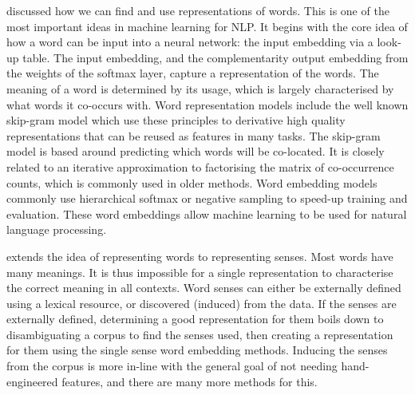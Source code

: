\documentclass[12pt,parskip]{komatufte}
\begin{document}

 discussed how we can find and use representations of words.
This is one of the most important ideas in machine learning for NLP.
It begins with the core idea of how a word can be input into a neural network:
the input embedding via a look-up table.
The input embedding, and the complementarity output embedding from the weights of the softmax layer, capture a representation of the words.
The meaning of a word is determined by its usage, which is largely characterised by what words it co-occurs with.
Word representation models include the well known skip-gram model which use these principles to derivative high quality representations that can be reused as features in many tasks.
The skip-gram model is based around predicting which words will be co-located.
It is closely related to an iterative approximation to factorising the matrix of co-occurrence counts, which is commonly used in older methods.
Word embedding models commonly use  hierarchical softmax or negative sampling to speed-up training and evaluation.
These word embeddings allow machine learning to be used for natural language processing.


 extends the idea of representing words to representing senses.
Most words have many meanings.
It is thus impossible for a single representation to characterise the correct meaning in all contexts.
Word senses can either be externally defined using a lexical resource,
or discovered (induced) from the data.
If the senses are externally defined, determining a good representation for them boils down to disambiguating a corpus to find the senses used, then creating a representation for them using the single sense word embedding methods.
Inducing the senses from the corpus is more in-line with the general goal of not needing hand-engineered features, and there are many more methods for this.
\end{document}
